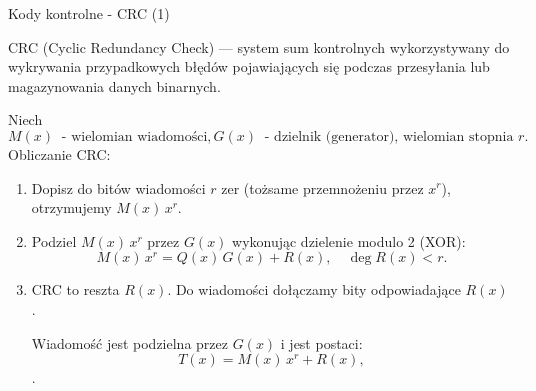 \documentclass[polish,envcountsect,10pt]{beamer}
\begin{document}
\begin{frame}{Kody kontrolne - CRC (1)}
    \begin{definition}
        CRC (Cyclic Redundancy Check) — system sum kontrolnych wykorzystywany do wykrywania przypadkowych błędów pojawiających się podczas przesyłania lub magazynowania danych binarnych.
    \end{definition}
    Niech \[
        M(x)\ \text{ - wielomian wiadomości}, G(x)\ \text{ - dzielnik (generator), wielomian stopnia } r.
    \]
    Obliczanie CRC:
    \begin{enumerate}
        \item Dopisz do bitów wiadomości $r$ zer (tożsame przemnożeniu przez $x^{r}$), otrzymujemy $M(x)\,x^{r}$.
        \item Podziel \(M(x)\,x^{r}\) przez \(G(x)\) wykonując dzielenie modulo 2 (XOR): 
        \[
            M(x)\,x^{r} = Q(x)\,G(x) + R(x),\quad \deg R(x) < r.
        \]
        \item CRC to reszta \(R(x)\). Do wiadomości dołączamy bity odpowiadające \(R(x)\). 
        
        Wiadomość jest podzielna przez \(G(x)\) i jest postaci: 
        \[
            T(x) = M(x)\,x^{r} + R(x),
        \].
    \end{enumerate}
\end{frame}
%
\end{document}

